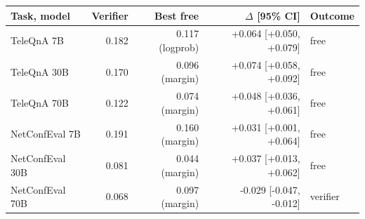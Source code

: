 \begin{tabular}{lrrrl}
\toprule
Task, model & Verifier & Best free & $\Delta$ [95\% CI] & Outcome \\
\midrule
TeleQnA 7B & 0.182 & 0.117 (logprob) & +0.064 [+0.050, +0.079] & free \\
TeleQnA 30B & 0.170 & 0.096 (margin) & +0.074 [+0.058, +0.092] & free \\
TeleQnA 70B & 0.122 & 0.074 (margin) & +0.048 [+0.036, +0.061] & free \\
NetConfEval 7B & 0.191 & 0.160 (margin) & +0.031 [+0.001, +0.064] & free \\
NetConfEval 30B & 0.081 & 0.044 (margin) & +0.037 [+0.013, +0.062] & free \\
NetConfEval 70B & 0.068 & 0.097 (margin) & -0.029 [-0.047, -0.012] & verifier \\
\bottomrule
\end{tabular}
